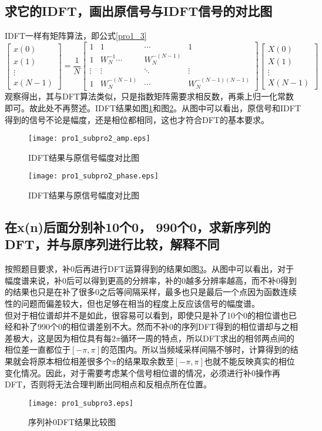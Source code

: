 \documentclass[fleqn,10pt]{SelfArx} %
\begin{document}
\begin{CJK}{UTF8}{gkai}
\subsection{求它的IDFT，画出原信号与IDFT信号的对比图}
IDFT一样有矩阵算法，即公式\ref{pro1_3}
\begin{equation}
\left[\begin{array}{c}
x(0)\\
x(1)\\
\vdots\\
x(N-1)
\end{array}\right]
=
\frac{1}{N}
\left[\begin{array}{cccc}
1 & 1 & \cdots & 1\\
1 & W_N^{-1} \cdots & W_N^{-(N-1)}\\
\vdots&\vdots&\ddots&\vdots\\
1 & W_N^{-(N-1)} & \cdots & W_N^{-(N-1)(N-1)}
\end{array}
\right]
\left[
\begin{array}{c}
  X(0)\\
  X(1)\\
  \vdots\\
  X(N-1)
\end{array}
\right]\label{pro1_3}
\end{equation}
观察得出，其与DFT算法类似，只是指数矩阵需要求相反数，再乘上归一化常数即可。故此处不再赘述。IDFT结果如图\ref{pro1_fig2}和图\ref{pro1_fig3}。从图中可以看出，原信号和IDFT得到的信号不论是幅度，还是相位都相同，这也才符合DFT的基本要求。
\begin{figure}
  \centering
  \texttt{[image: pro1\_subpro2\_amp.eps]}
  \caption{IDFT结果与原信号幅度对比图}
  \label{pro1_fig2}
\end{figure}
\begin{figure}
  \centering
  \texttt{[image: pro1\_subpro2\_phase.eps]}
  \caption{IDFT结果与原信号幅度对比图}
  \label{pro1_fig3}
\end{figure}
\subsection{在x(n)后面分别补10个0， 990个0，求新序列的DFT，并与原序列进行比较，解释不同}
按照题目要求，补0后再进行DFT运算得到的结果如图\ref{pro1_fig4}。从图中可以看出，对于幅度谱来说，补0后可以得到更高的分辨率，补的0越多分辨率越高，而不补0得到的结果也只是在补了很多0之后等间隔采样，最多也只是最后一个点因为函数连续性的问题而偏差较大，但也足够在相当的程度上反应该信号的幅度谱。\\
但对于相位谱却并不是如此，很容易可以看到，即使只是补了10个0的相位谱也已经和补了990个0的相位谱差别不大。然而不补0的序列DFT得到的相位谱却与之相差极大，这是因为相位具有每$2\pi$循环一周的特点，所以DFT求出的相邻两点间的相位差一直都位于$[-\pi,\pi]$的范围内。所以当频域采样间隔不够时，计算得到的结果就会将原本相位相差很多个$\pi$的结果取余数至$[-\pi,\pi]$也就不能反映真实的相位变化情况。因此，对于需要考虑某个信号相位谱的情况，必须进行补0操作再DFT，否则将无法合理判断出同相点和反相点所在位置。
\begin{figure}
  \centering
  \texttt{[image: pro1\_subpro3.eps]}
  \caption{序列补0DFT结果比较图}
  \label{pro1_fig4}
\end{figure}

\end{CJK}
\end{document}
